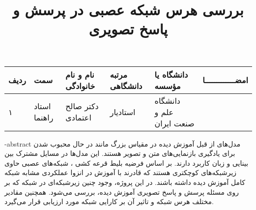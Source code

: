 



\subject{مهندسی کامپیوتر}


\title{بررسی هرس شبکه عصبی در پرسش و پاسخ تصویری}







\firstPage
\besmPage
\davaranPage

\vspace{.5cm}

\begin{center}
	\begin{tabular}{| p{8mm} | p{18mm} | p{} |p{14mm}|p{}|c|}
		\hline
		ردیف	& سمت & نام و نام خانوادگی & مرتبه \newline دانشگاهی &	دانشگاه یا مؤسسه &	امضـــــــــــــا\\
		\hline
		۱  &	استاد راهنما & دکتر \newline  صالح اعتمادی & استادیار & دانشگاه \newline علم و صنعت ایران &  \\
		\hline

	\end{tabular}
\end{center}


\fa-abstract{
مدل‌های از قبل آموزش دیده در مقیاس بزرگ مانند
در حال محبوب شدن برای یادگیری بازنمایی‌های متن و تصویر هستند. این مدل‌ها در مسايل مشترک بین بینایی و زبان کاربرد دارند. بر اساس فرضیه بلیط قرعه کشی
،
 شبکه‌های عصبی حاوی زیرشبکه‌های 
 کوچکتری هستند که قادرند با آموزش در انزوا
  عملکردی مشابه شبکه کامل آموزش دیده داشته باشند. در این پروژه، وجود چنین زیرشبکه‌ای در شبکه
   که بر روی مسئله پرسش و پاسخ تصویری آموزش دیده، بررسی می‌شود. همچنین مقادیر مختلف هرس شبکه و تاثیر آن بر کارایی شبکه مورد ارزیابی قرار می‌گیرد.
}

\abstractPage

\newpage\clearpage

